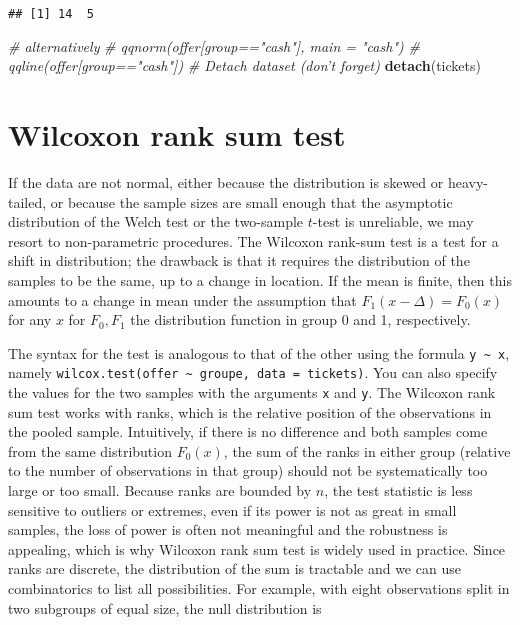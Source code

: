 \documentclass[
]{book}
\newenvironment{Shaded}{\begin{snugshade}}{\end{snugshade}}
\newcommand{\CommentTok}[1]{\textcolor[rgb]{0.56,0.35,0.01}{\textit{#1}}}
\newcommand{\KeywordTok}[1]{\textcolor[rgb]{0.13,0.29,0.53}{\textbf{#1}}}
\newcommand{\NormalTok}[1]{#1}
\begin{document}
\begin{verbatim}
## [1] 14  5
\end{verbatim}

\begin{Shaded}
\begin{Highlighting}[]
\CommentTok{# alternatively}
\CommentTok{# qqnorm(offer[group=="cash"], main = "cash")}
\CommentTok{# qqline(offer[group=="cash"])}
\CommentTok{# Detach dataset (don't forget)}
\KeywordTok{detach}\NormalTok{(tickets)}
\end{Highlighting}
\end{Shaded}

\hypertarget{wilcoxon-rank-sum-test}{%
\section{Wilcoxon rank sum test}\label{wilcoxon-rank-sum-test}}

If the data are not normal, either because the distribution is skewed or heavy-tailed, or because the sample sizes are small enough that the asymptotic distribution of the Welch test or the two-sample \(t\)-test is unreliable, we may resort to non-parametric procedures. The Wilcoxon rank-sum test is a test for a shift in distribution; the drawback is that it requires the distribution of the samples to be the same, up to a change in location. If the mean is finite, then this amounts to a change in mean under the assumption that \(F_1(x-\Delta)=F_0(x)\) for any \(x\) for \(F_0, F_1\) the distribution function in group 0 and 1, respectively.

The syntax for the test is analogous to that of the other using the formula \texttt{y\ \textasciitilde{}\ x}, namely \texttt{wilcox.test(offer\ \textasciitilde{}\ groupe,\ data\ =\ tickets)}. You can also specify the values for the two samples with the arguments \texttt{x} and \texttt{y}.
The Wilcoxon rank sum test works with ranks, which is the relative position of the observations in the pooled sample. Intuitively, if there is no difference and both samples come from the same distribution \(F_0(x)\), the sum of the ranks in either group (relative to the number of observations in that group) should not be systematically too large or too small. Because ranks are bounded by \(n\), the test statistic is less sensitive to outliers or extremes, even if its power is not as great in small samples, the loss of power is often not meaningful and the robustness is appealing, which is why Wilcoxon rank sum test is widely used in practice. Since ranks are discrete, the distribution of the sum is tractable and we can use combinatorics to list all possibilities. For example, with eight observations split in two subgroups of equal size, the null distribution is
\end{document}
